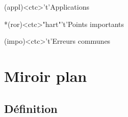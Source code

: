 \documentclass[../../main/main.tex]{subfiles}
\begin{document}
\begin{tcn}[%
		sidebyside, fontupper=\small, fontlower=\small
	]
	\begin{tcn}(appl)<ctc>'t'{Applications}
	\end{tcn}
	\begin{tcn}*(ror)<ctc>"hart"'t'{Points importants}
	\end{tcn}
	\begin{tcn}(impo)<ctc>'t'{Erreurs communes}
	\end{tcn}
\end{tcn}

\vspace*{\fill}

\newpage

\section{Miroir plan}
\subsection{Définition}
\end{document}
